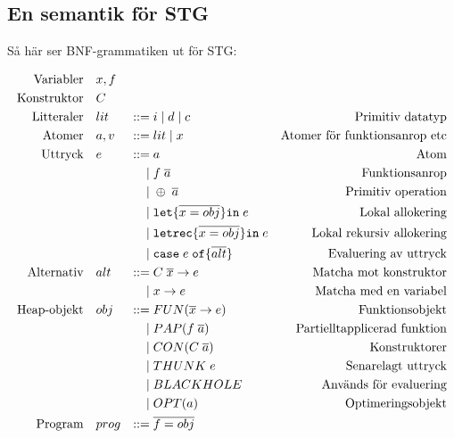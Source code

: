\documentclass[../Core]{subfiles}
\begin{document}
\subsection{En semantik för STG}
\label{sec:SemStg}






Så här ser BNF-grammatiken ut för STG:


\begin{equation*}
\begin{aligned}
\text{Variabler} \quad & x,f \\
\text{Konstruktor} \quad & C \\
\text{Litteraler}\quad&lit&::=&\;i \; | \;  d \;|\; c&\text{Primitiv datatyp} \\
\text{Atomer}\quad&a, v&::=&\;lit \; | \; x&\text{Atomer för funktionsanrop etc} \\
\text{Uttryck}\quad&e&::=&\;a&\text{Atom} \\
    &&|&\;f \; \overline{a}&\text{Funktionsanrop} \\
    &&|&\;\oplus \; \overline{a}&\text{Primitiv operation} \\
    &&|&\;\mathtt{let \{} \overline{x = obj} \mathtt{ \} in } \; e&\text{Lokal allokering} \\
    &&|&\;\mathtt{letrec \{} \overline{x = obj} \mathtt{ \} in } \; e&\text{Lokal rekursiv allokering} \\
    &&|&\;\mathtt{case} \; e \;  \mathtt{ of \{ } \overline{alt} \mathtt{\}}&\text{Evaluering av uttryck} \\
\text{Alternativ}\quad&alt&::=&\;C \; \overline{x} \rightarrow e&\text{Matcha mot konstruktor} \\
    &&|&\;x \rightarrow e&\text{Matcha med en variabel} \\
\text{Heap-objekt}\quad&obj&::=&\;FUN(\overline{x} \rightarrow e)&\text{Funktionsobjekt} \\
    &&|&\;PAP(f \; \overline{a})&\text{Partielltapplicerad funktion} \\
    &&|&\;CON(C \; \overline{a})&\text{Konstruktorer} \\
    &&|&\;THUNK \; e&\text{Senarelagt uttryck} \\
    &&|&\;BLACKHOLE&\text{Används för evaluering} \\
    &&|&\;OPT(a)&\text{Optimeringsobjekt} \\
\text{Program}\quad&prog&::=&\;\overline{f=obj}&\text{}
\end{aligned}
\end{equation*}
\end{document}
